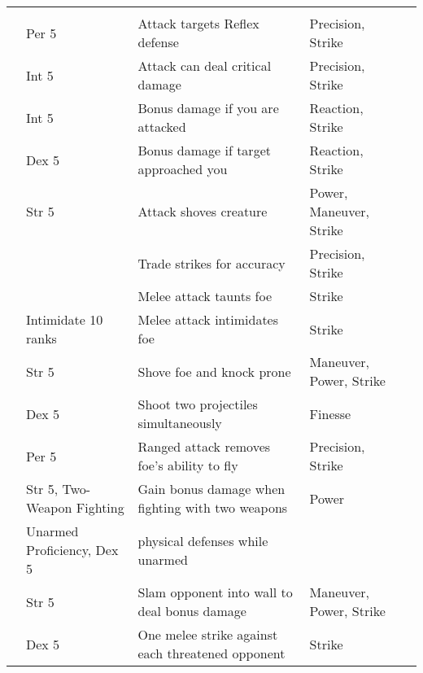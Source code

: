 \begin{longtabuwrapper}
\begin{longtabu}{>{\lcol}p{10em} >{\lcol}p{15em} >{\lcol}X >{\lcol}p{8em} >{\lcol}p{3em}}
        \midrule
         &  &  &  &  \\
         & Per 5 & Attack targets Reflex defense & Precision, Strike &  \\
         & Int 5 & Attack can deal critical damage & Precision, Strike &  \\
         & Int 5 & Bonus damage if you are attacked & Reaction, Strike &  \\
         & Dex 5 & Bonus damage if target approached you & Reaction, Strike &  \\
         & Str 5 & Attack shoves creature  & Power, Maneuver, Strike &  \\
         & \x & Trade strikes for accuracy & Precision, Strike &  \\
         & \x & Melee attack taunts foe & Strike &  \\
         & Intimidate 10 ranks & Melee attack intimidates foe & Strike &  \\
         & Str 5 & Shove foe and knock prone & Maneuver, Power, Strike &  \\
         & Dex 5 & Shoot two projectiles simultaneously & Finesse &  \\
         & Per 5 & Ranged attack removes foe's ability to fly & Precision, Strike &  \\
         & Str 5, Two-Weapon Fighting & Gain bonus damage when fighting with two weapons & Power &  \\
         & Unarmed Proficiency, Dex 5 &  physical defenses while unarmed & \x &  \\
         & Str 5 & Slam opponent into wall to deal bonus damage & Maneuver, Power, Strike &  \\
         & Dex 5 & One melee strike against each threatened opponent & Strike &  \\


\end{longtabu}
\end{longtabuwrapper}

